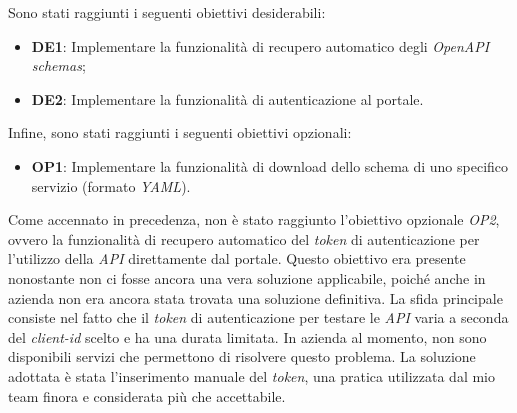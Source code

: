 Sono stati raggiunti i seguenti obiettivi desiderabili:
\begin{itemize}
  \item \textbf{DE1}:  Implementare la funzionalità di recupero automatico degli \textit{OpenAPI schemas};
  \item \textbf{DE2}: Implementare la funzionalità di autenticazione al portale.
\end{itemize}

Infine, sono stati raggiunti i seguenti obiettivi opzionali:
\begin{itemize}
  \item \textbf{OP1}: Implementare la funzionalità di download dello schema di uno specifico servizio (formato \textit{YAML}).
\end{itemize}

Come accennato in precedenza, non è stato raggiunto l'obiettivo opzionale \textit{OP2}, ovvero la funzionalità di recupero automatico del \textit{token} di autenticazione per l'utilizzo della \textit{API} direttamente dal portale.
Questo obiettivo era presente nonostante non ci fosse ancora una vera soluzione applicabile, poiché anche in azienda non era ancora stata trovata una soluzione definitiva.
La sfida principale consiste nel fatto che il \textit{token} di autenticazione per testare le \textit{API} varia a seconda del \textit{client-id} scelto e ha una durata limitata. In azienda al momento, non sono disponibili servizi che permettono di risolvere questo problema.
La soluzione adottata è stata l'inserimento manuale del \textit{token}, una pratica utilizzata dal mio team finora e considerata più che accettabile.
